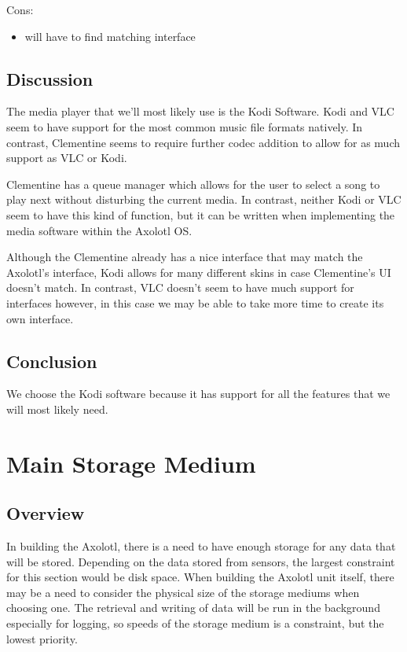 \documentclass[onecolumn, draftclsnofoot,10pt, compsoc]{IEEEtran}
\begin{document}
Cons:
\begin{itemize}
    \item will have to find matching interface
\end{itemize}

\subsection{Discussion}
The media player that we'll most likely use is the Kodi Software.
Kodi and VLC seem to have support for the most common music file formats natively.
In contrast, Clementine seems to require further codec addition to allow for as
much support as VLC or Kodi. 

Clementine has a queue manager which allows for the user to select a song to play
next without disturbing the current media. In contrast, neither Kodi or VLC seem to
have this kind of function, but it can be written when implementing the media
software within the Axolotl OS. 

Although the Clementine already has a nice interface that may match the Axolotl's
interface, Kodi allows for many different skins in case Clementine's UI doesn't
match. In contrast, VLC doesn't seem to have much support for interfaces however, 
in this case we may be able to take more time to create its own interface.

\subsection{Conclusion}
We choose the Kodi software because it has support for all the features that we will most likely need.

\section{Main Storage Medium}
\subsection{Overview}
In building the Axolotl, there is a need to have enough storage for any data that will be stored. Depending on the data stored from sensors, the largest constraint for this section would be disk space. When building the Axolotl unit itself, there may be a need to consider the physical size of the storage mediums when choosing one. The retrieval and writing of data will be run in the background especially for logging, so speeds of the storage medium is a constraint, but the lowest priority.
\end{document}
